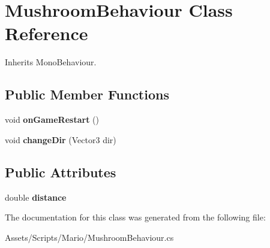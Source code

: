 \hypertarget{class_mushroom_behaviour}{\section{Mushroom\-Behaviour Class Reference}
\label{class_mushroom_behaviour}
}


Inherits Mono\-Behaviour.

\subsection*{Public Member Functions}
\begin{DoxyCompactItemize}
\item 
\hypertarget{class_mushroom_behaviour_ab2f45dcfb85c52de5b12f36f10f71f4d}{void {\bfseries on\-Game\-Restart} ()}\label{class_mushroom_behaviour_ab2f45dcfb85c52de5b12f36f10f71f4d}

\item 
\hypertarget{class_mushroom_behaviour_ab6f81c80f4460c6ea8e40d937dff8dc7}{void {\bfseries change\-Dir} (Vector3 dir)}\label{class_mushroom_behaviour_ab6f81c80f4460c6ea8e40d937dff8dc7}

\end{DoxyCompactItemize}
\subsection*{Public Attributes}
\begin{DoxyCompactItemize}
\item 
\hypertarget{class_mushroom_behaviour_a86dfce43521cda4f4da44765dcbcb5c1}{double {\bfseries distance}}\label{class_mushroom_behaviour_a86dfce43521cda4f4da44765dcbcb5c1}

\end{DoxyCompactItemize}


The documentation for this class was generated from the following file\-:\begin{DoxyCompactItemize}
\item 
Assets/\-Scripts/\-Mario/Mushroom\-Behaviour.\-cs\end{DoxyCompactItemize}
